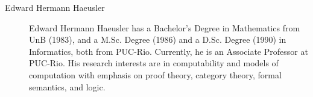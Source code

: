 \documentclass{article}
\begin{document}
\begin{description}
\item[Edward Hermann Haeusler] Edward Hermann Haeusler has a Bachelor's
  Degree in Mathematics from UnB (1983), and a M.Sc. Degree (1986) and a
  D.Sc. Degree (1990) in Informatics, both from PUC-Rio.  Currently, he is
  an Associate Professor at PUC-Rio.  His research interests are in
  computability and models of computation with emphasis on proof theory,
  category theory, formal semantics, and logic.
\end{description}
\end{document}
